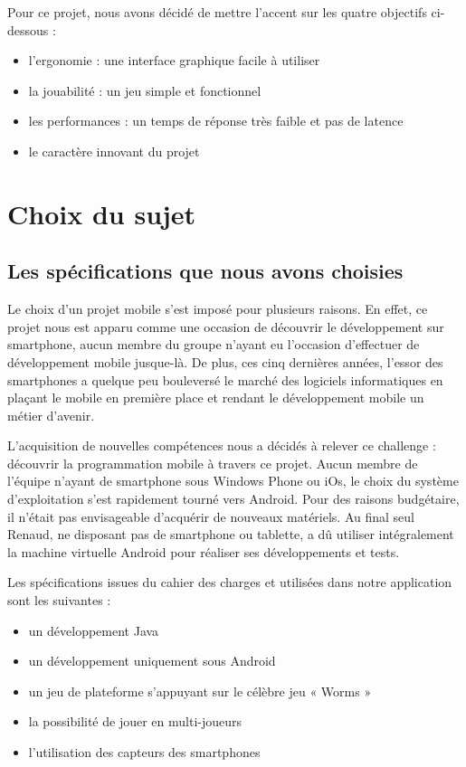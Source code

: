 \documentclass{report}
\begin{document}
\bigskip

Pour ce projet, nous avons décidé de mettre l’accent sur les quatre
objectifs ci-dessous :
\begin{itemize}
\item l’ergonomie : une interface graphique facile à utiliser
\item la jouabilité : un jeu simple et fonctionnel
\item les performances : un temps de réponse très faible et pas de latence 
\item le caractère innovant du projet
\end{itemize}


\newpage

\section{Choix du sujet}
\bigskip

\subsection{Les spécifications que nous avons choisies}
\bigskip


Le choix d’un projet mobile s’est imposé pour plusieurs raisons. 
En effet, ce projet nous est apparu comme une occasion de découvrir
le développement sur smartphone, aucun membre du groupe n’ayant eu
l’occasion d'effectuer de développement mobile jusque-là. De plus,
ces cinq dernières années, l'essor des smartphones a quelque peu
bouleversé le marché des logiciels informatiques en plaçant le mobile
en première place et rendant le développement mobile un métier d’avenir.

L’acquisition de nouvelles compétences nous a décidés à relever ce
challenge : découvrir la programmation mobile à travers ce projet. 
Aucun membre de l’équipe n’ayant de smartphone sous Windows Phone ou
iOs, le choix du système d’exploitation s’est rapidement tourné vers
Android. Pour des raisons budgétaire, il n’était pas envisageable
d’acquérir de nouveaux matériels.
Au final seul Renaud, ne disposant pas de smartphone ou tablette, a
dû utiliser intégralement la machine virtuelle Android pour réaliser
ses développements et tests.

Les spécifications issues du cahier des charges et utilisées dans
notre application sont les suivantes :
\begin{itemize}
\item un développement Java
\item un développement uniquement sous Android 
\item un jeu de plateforme s’appuyant sur le célèbre jeu « Worms »
\item la possibilité de jouer en multi-joueurs
\item l’utilisation des capteurs des smartphones
\end{itemize}
\end{document}
